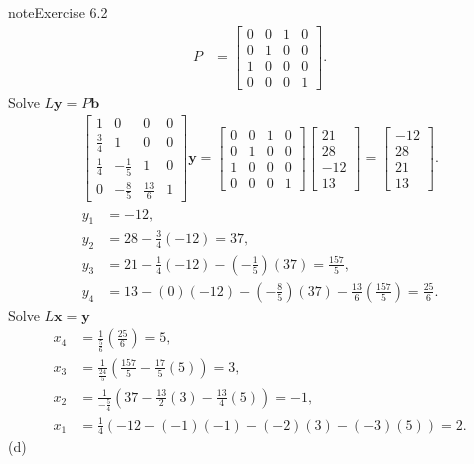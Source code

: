 \documentclass[letterpaper,10pt,english]{jupyterBook}
\begin{document}
\begin{sphinxadmonition}{note}{Exercise 6.2}
\begin{align*}
    P &= \left[\begin{matrix}0 & 0 & 1 & 0\\0 & 1 & 0 & 0\\1 & 0 & 0 & 0\\0 & 0 & 0 & 1\end{matrix}\right].
\end{align*}
\sphinxAtStartPar
Solve \(L \mathbf{y} = P \mathbf{b}\)
\begin{align*} \left[\begin{matrix}1 & 0 & 0 & 0\\\frac{3}{4} & 1 & 0 & 0\\\frac{1}{4} & - \frac{1}{5} & 1 & 0\\0 & - \frac{8}{5} & \frac{13}{6} & 1\end{matrix}\right] \mathbf{y} = \left[\begin{matrix}0 & 0 & 1 & 0\\0 & 1 & 0 & 0\\1 & 0 & 0 & 0\\0 & 0 & 0 & 1\end{matrix}\right] \left[\begin{matrix}21\\28\\-12\\13\end{matrix}\right] = \left[\begin{matrix}-12\\28\\21\\13\end{matrix}\right]. \end{align*}\begin{align*}
    y_{1} &= -12, \\
    y_{2} &= 28 - \frac{3}{4}\left(-12\right) = 37, \\
    y_{3} &= 21 - \frac{1}{4}\left(-12\right) - \left(- \frac{1}{5}\right)\left(37\right) = \frac{157}{5}, \\
    y_{4} &= 13 - \left(0\right)\left(-12\right) - \left(- \frac{8}{5}\right)\left(37\right) - \frac{13}{6}\left(\frac{157}{5}\right) = \frac{25}{6}.
\end{align*}
\sphinxAtStartPar
Solve \(L \mathbf{x} = \mathbf{y}\)
\begin{align*}
    x_{4} &= \frac{1}{\frac{5}{6}}\left(\frac{25}{6}\right) = 5, \\
    x_{3} &= \frac{1}{\frac{24}{5}}\left(\frac{157}{5} - \frac{17}{5}\left(5\right)\right) = 3, \\
    x_{2} &= \frac{1}{- \frac{5}{4}}\left(37 - \frac{13}{2}\left(3\right) - \frac{13}{4}\left(5\right)\right) = -1, \\
    x_{1} &= \frac{1}{4}\left(-12 - \left(-1\right)\left(-1\right) - \left(-2\right)\left(3\right) - \left(-3\right)\left(5\right)\right) = 2.
\end{align*}
\sphinxAtStartPar
(d)

\end{sphinxadmonition}
\end{document}
